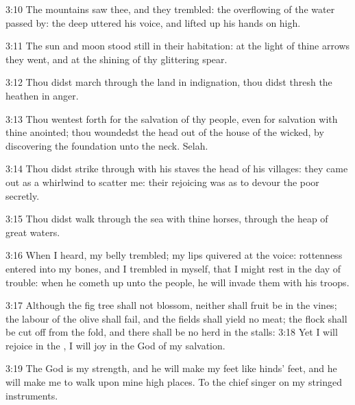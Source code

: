 3:10 The mountains saw thee, and they trembled: the overflowing of the
water passed by: the deep uttered his voice, and lifted up his hands
on high.

3:11 The sun and moon stood still in their habitation: at the light of
thine arrows they went, and at the shining of thy glittering spear.

3:12 Thou didst march through the land in indignation, thou didst
thresh the heathen in anger.

3:13 Thou wentest forth for the salvation of thy people, even for
salvation with thine anointed; thou woundedst the head out of the
house of the wicked, by discovering the foundation unto the neck.
Selah.

3:14 Thou didst strike through with his staves the head of his
villages: they came out as a whirlwind to scatter me: their rejoicing
was as to devour the poor secretly.

3:15 Thou didst walk through the sea with thine horses, through the
heap of great waters.

3:16 When I heard, my belly trembled; my lips quivered at the voice:
rottenness entered into my bones, and I trembled in myself, that I
might rest in the day of trouble: when he cometh up unto the people,
he will invade them with his troops.

3:17 Although the fig tree shall not blossom, neither shall fruit be
in the vines; the labour of the olive shall fail, and the fields shall
yield no meat; the flock shall be cut off from the fold, and there
shall be no herd in the stalls: 3:18 Yet I will rejoice in the \LORD, I
will joy in the God of my salvation.

3:19 The \LORD God is my strength, and he will make my feet like hinds'
feet, and he will make me to walk upon mine high places. To the chief
singer on my stringed instruments.

